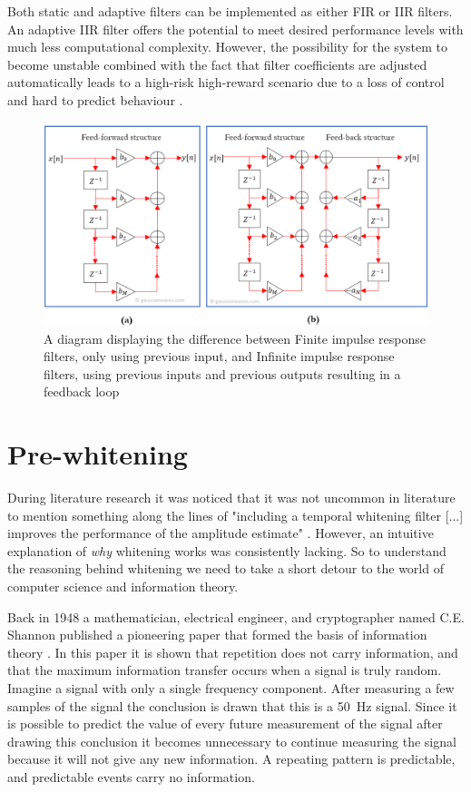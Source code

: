 Both static and adaptive filters can be implemented as either FIR or IIR filters. An adaptive IIR filter offers the potential to meet desired performance levels with much less computational complexity. However, the possibility for the system to become unstable combined with the fact that filter coefficients are adjusted automatically leads to a high-risk high-reward scenario due to a loss of control and hard to predict behaviour \cite{digital_signal_processing_handbook}.

\begin{figure}[h!t]
	\begin{center}
		\includegraphics[width=1.0\columnwidth]{images/fir_vs_iir_diagram.png}
	\end{center}
	\caption{A diagram displaying the difference between Finite impulse response filters, only using previous input, and Infinite impulse response filters, using previous inputs and previous outputs resulting in a feedback loop \cite{fir_vs_iir_diagram}}
	\label{fig:fir_vs_iir_diagram}
\end{figure}


\section{Pre-whitening}
During literature research it was noticed that it was not uncommon in literature to mention something along the lines of "including a temporal whitening filter [...] improves the performance of the amplitude estimate" \cite{single_site_emg_amplitude_estimation,adaptive_whitening,emg_whitening}. However, an intuitive explanation of \textit{why} whitening works was consistently lacking. So to understand the reasoning behind whitening we need to take a short detour to the world of computer science and information theory.

Back in 1948 a mathematician, electrical engineer, and cryptographer named C.E. Shannon published a pioneering paper that formed the basis of information theory \cite{shannon}. In this paper it is shown that repetition does not carry information, and that the maximum information transfer occurs when a signal is truly random. Imagine a signal with only a single frequency component. After measuring a few samples of the signal the conclusion is drawn that this is a \SI{50}{\hertz} signal. Since it is possible to predict the value of every future measurement of the signal after drawing this conclusion it becomes unnecessary to continue measuring the signal because it will not give any new information. A repeating pattern is predictable, and predictable events carry no information.

